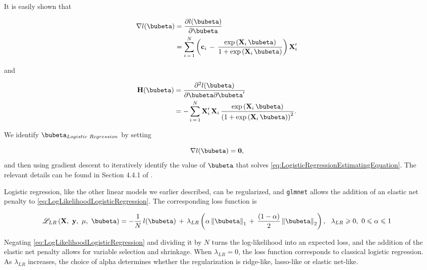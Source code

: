 \documentclass[graybox,envcountchap,sectrefs]{svmono}\usepackage[]{graphicx}\usepackage[]{xcolor}
\begin{document}
\begin{appendices}
It is easily shown that

\begin{align}
\nabla l(\bubeta) & =\frac{\partial l(\bubeta)}{\partial\bubeta}\nonumber \\
 & =\sum_{i\,=\,1}^{N}\left(\mathbf{c}_{i}\,-\,\frac{\exp\left(\mathbf{X}_{i}\,\bubeta\right)}{1+\exp\left(\mathbf{X}_{i}\,\bubeta\right)}\right)\mathbf{X}_{i}^{\prime}\label{eq:LogisticRegressionGradient}
\end{align}

and 

\begin{align}
\mathbf{H}(\bubeta) & =\frac{\partial^{2}l(\bubeta)}{\partial\bubeta\partial\bubeta^{\prime}}\nonumber \\
 & =-\sum_{i\,=\,1}^{N}\mathbf{X}_{i}^{\prime}\,\mathbf{X}_{i}\,\frac{\exp\left(\mathbf{X}_{i}\,\bubeta\right)}{\left(1+\exp\left(\mathbf{X}_{i}\,\bubeta\right)\right)^{2}}.\label{eq:LogisticRegressionHessian}
\end{align}

We identify $\bubeta_{Logistic\ Regression}$ by setting

\begin{equation}
\nabla l(\bubeta)=\mathbf{0},\label{eq:LogisticRegressionEstimatingEquation}
\end{equation}
and then using gradient descent to iteratively identify the value
of $\bubeta$ that solves \eqref{eq:LogisticRegressionEstimatingEquation}.
The relevant details can be found in Section 4.4.1 of \citet{HastieTibshiraniFriedman2009}. 

Logistic regression, like the other linear models we earlier described,
can be regularized, and \texttt{glmnet} allows the addition of an
elastic net penalty to \eqref{eq:LogLikelihoodLogisticRegression}.
The corresponding loss function is

\[
\mathscr{L}_{LR}\left(\mathbf{X},\ \mathbf{y},\ \mu,\ \bubeta\right)=-\frac{1}{N}\,l(\bubeta)\,+\,\lambda_{LR}\left(\alpha\left\Vert \bubeta\right\Vert _{1}\,+\,\frac{\left(1-\alpha\right)}{2}\left\Vert \bubeta\right\Vert _{2}\right),\ \ \lambda_{LR}\geqslant0,\ 0\leqslant\alpha\leqslant1
\]

Negating \eqref{eq:LogLikelihoodLogisticRegression} and dividing
it by $N$ turns the log-likelihood into an expected loss, and the
addition of the elastic net penalty allows for variable selection
and shrinkage. When $\lambda_{LR}=0$, the loss function corresponds
to classical logistic regression. As $\lambda_{LR}$ increases, the
choice of alpha determines whether the regularization is ridge-like,
lasso-like or elastic net-like. 


\end{appendices}
\end{document}

